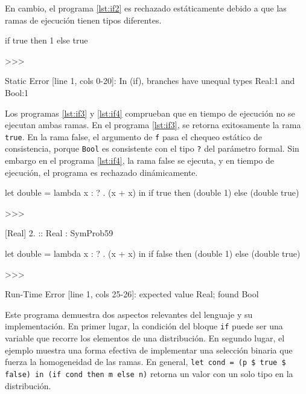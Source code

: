 En cambio, el programa \ref{lst:if2} es rechazado
estáticamente debido a que las ramas de
ejecución tienen tipos diferentes.


\begin{gplcblock}[caption={if2},label={lst:if2}]
if true then 1 else true

>>>

Static Error [line 1, cols 0-20]: In (if), branches have unequal types {Real:1} and {Bool:1}
\end{gplcblock}


Los programas \ref{lst:if3} y \ref{lst:if4} comprueban que en
tiempo de ejecución no se ejecutan ambas ramas.
En el programa \ref{lst:if3}, se retorna exitosamente la
rama \lstinline|true|. En la rama false, el argumento de \lstinline|f|
pasa el chequeo estático de consistencia, porque
\lstinline|Bool| es consistente con el tipo \lstinline|?| del parámetro
formal. Sin embargo en el programa \ref{lst:if4}, la rama
false se ejecuta, y en tiempo de ejecución, el
programa es rechazado dinámicamente.

\begin{gplcblock}[caption={if3},label={lst:if3}]
let double = lambda x : ? . (x + x) in
if true then (double 1) else (double true) 

>>>

{
	 [Real] 2. :: Real : SymProb59 
}  
\end{gplcblock}


\begin{gplcblock}[caption={if4},label={lst:if4}]
let double = lambda x : ? . (x + x) in
if false then (double 1) else (double true)

>>>

Run-Time Error [line 1, cols 25-26]: expected value Real; found Bool
\end{gplcblock}




  
  Este programa demuestra dos aspectos relevantes
  del lenguaje y su implementación. En primer lugar,
la condición del bloque \lstinline|if| puede ser una variable
que recorre los elementos de una distribución. En
segundo lugar, el ejemplo muestra una forma efectiva
de implementar una selección binaria que fuerza la
homogeneidad de las ramas. En general,
\lstinline|let cond = (p $ true $ false) in (if cond then m else n)|
retorna un valor con un solo tipo en la distribución.


